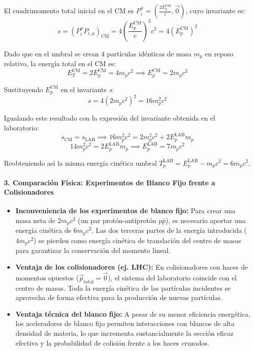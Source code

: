 \begin{problema}
El cuadrimomento total inicial en el CM es $P_i^\mu = \left( \frac{2 E_p^{\text{CM}}}{c}, \vec{0} \right)$, cuyo invariante es:
\begin{equation*}
s = (P_i^\mu P_{i,\mu})_{\text{CM}} = 4 \left( \frac{E_p^{\text{CM}}}{c} \right)^2 c^2 = 4 (E_p^{\text{CM}})^2
\end{equation*}

Dado que en el umbral se crean 4 partículas idénticas de masa $m_p$ en reposo relativo, la energía total en el CM es:
\begin{equation*}
E_{T}^{\text{CM}} = 2 E_p^{\text{CM}} = 4 m_p c^2 \implies E_p^{\text{CM}} = 2 m_p c^2
\end{equation*}

Sustituyendo $E_p^{\text{CM}}$ en el invariante $s$:
\begin{equation*}
s = 4 (2 m_p c^2)^2 = 16 m_p^2 c^2
\end{equation*}

Igualando este resultado con la expresión del invariante obtenida en el laboratorio:
\begin{equation*}
s_{\text{CM}} = s_{\text{LAB}} \implies 16 m_p^2 c^2 = 2 m_p^2 c^2 + 2 E_p^{\text{LAB}} m_p
\end{equation*}
\begin{equation*}
14 m_p^2 c^2 = 2 E_p^{\text{LAB}} m_p \implies E_p^{\text{LAB}} = 7 m_p c^2
\end{equation*}

Reobteniendo así la misma energía cinética umbral $T_p^{\text{LAB}} = E_p^{\text{LAB}} - m_p c^2 = 6 m_p c^2$.

\paragraph{3. Comparación Física: Experimentos de Blanco Fijo frente a Colisionadores}

\begin{itemize}
    \item \textbf{Inconveniencia de los experimentos de blanco fijo:} Para crear una masa neta de $2 m_p c^2$ (un par protón-antiprotón $p\bar{p}$), es necesario aportar una energía cinética de $6 m_p c^2$. Las dos terceras partes de la energía introducida ($4 m_p c^2$) se pierden como energía cinética de translación del centro de masas para garantizar la conservación del momento lineal.
    \item \textbf{Ventaja de los colisionadores (ej. LHC):} En colisionadores con haces de momentos opuestos ($\vec{p}_{\text{total}} = \vec{0}$), el sistema del laboratorio coincide con el centro de masas. Toda la energía cinética de las partículas incidentes se aprovecha de forma efectiva para la producción de nuevas partículas.
    \item \textbf{Ventaja técnica del blanco fijo:} A pesar de su menor eficiencia energética, los aceleradores de blanco fijo permiten interacciones con blancos de alta densidad de materia, lo que incrementa sustancialmente la sección eficaz efectiva y la probabilidad de colisión frente a los haces cruzados.
\end{itemize}
\end{problema}

